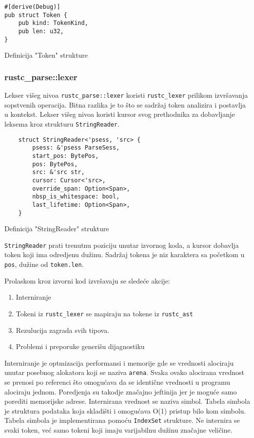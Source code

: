 \begin{listing}[H]
\begin{verbatim}
#[derive(Debug)]
pub struct Token {
    pub kind: TokenKind,
    pub len: u32,
}   
\end{verbatim}
\caption{Definicija "Token" strukture}
\end{listing}

\subsubsection{rustc\_parse::lexer}

Lekser višeg nivoa \verb|rustc_parse::lexer| koristi \verb|rustc_lexer| prilikom izvršavanja sopstvenih
operacija. Bitna razlika je to što se sadržaj token analizira i postavlja u kontekst.
Lekser višeg nivoa koristi kursor svog prethodnika za dobavljanje leksema kroz strukturu \verb|StringReader|. 

\begin{listing}[H]
\begin{verbatim}
    struct StringReader<'psess, 'src> {
        psess: &'psess ParseSess,
        start_pos: BytePos,
        pos: BytePos,
        src: &'src str,
        cursor: Cursor<'src>,
        override_span: Option<Span>,
        nbsp_is_whitespace: bool,
        last_lifetime: Option<Span>,
    }
\end{verbatim}
\caption{Definicija "StringReader" strukture}
\end{listing}
\verb|StringReader| prati trenutnu poziciju unutar izvornog koda, a kursor 
dobavlja token koji ima odredjenu dužinu. Sadržaj tokena je niz karaktera sa početkom u \verb|pos|,
dužine od \verb|token.len|. 

Prolaskom kroz izvorni kod izvršavaju se sledeće akcije:
\begin{enumerate}
    \item Interniranje 
    \item Tokeni iz \verb|rustc_lexer| se mapiraju na tokene iz \verb|rustc_ast|
    \item Rezulucija zagrada svih tipova.
    \item Problemi i preporuke generišu dijagnostiku 
\end{enumerate}

Interniranje je optmizacija performansi i memorije gde se vrednosti alociraju unutar 
posebnog alokatora koji se naziva \verb|arena|. Svaka ovako alocirana vrednost se prenosi po 
referenci što omogućava da se identične vrednosti u programu alociraju jednom. Poredjenja
su takodje značajno jeftinija jer je moguće samo porediti memorijske adrese. 
Internirana vrednost se naziva simbol. Tabela simbola je struktura podataka
koja skladišti i omogućava O(1) pristup bilo kom simbolu.  Tabela simbola je implementirana pomoću \verb|IndexSet|
strukture. Ne internira se svaki token, već samo tokeni koji imaju varijabilnu dužinu značajne veličine.

